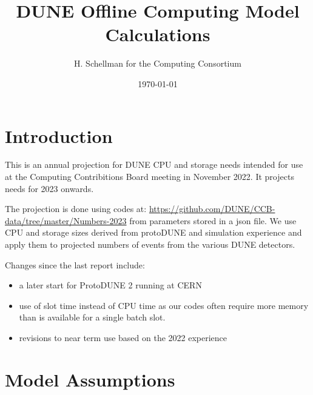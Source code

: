 \documentclass[12pt,landscape]{article}
\title{DUNE Offline Computing Model Calculations}
\author{H. Schellman for the Computing Consortium}
\date{\today}
\begin{document}
\makeatletter
{}
\makeatother
\newcommand{\csvautotabularright}[2][]{\csvloop{autotabularright={#2},#1}}

\maketitle
\section{Introduction}

This is an annual projection for DUNE CPU and storage needs intended for use at the Computing Contribitions Board meeting in November 2022. It projects needs for 2023 onwards. 

The projection is done using codes at: \href{https://github.com/DUNE/CCB-data/tree/master/Numbers-2023}{https://github.com/DUNE/CCB-data/tree/master/Numbers-2023} from parameters stored in a json file. We use CPU and storage sizes derived from protoDUNE and simulation experience and apply them to projected numbers of events from the various DUNE detectors. 

Changes since the last report include:

\begin{itemize}
\item a later start for ProtoDUNE 2 running at CERN
\item use of slot time instead of CPU time as our codes often require more memory than is available for a single batch slot. 
\item revisions to near term use based on the 2022 experience
\end{itemize}



\section{Model Assumptions}
\end{document}
